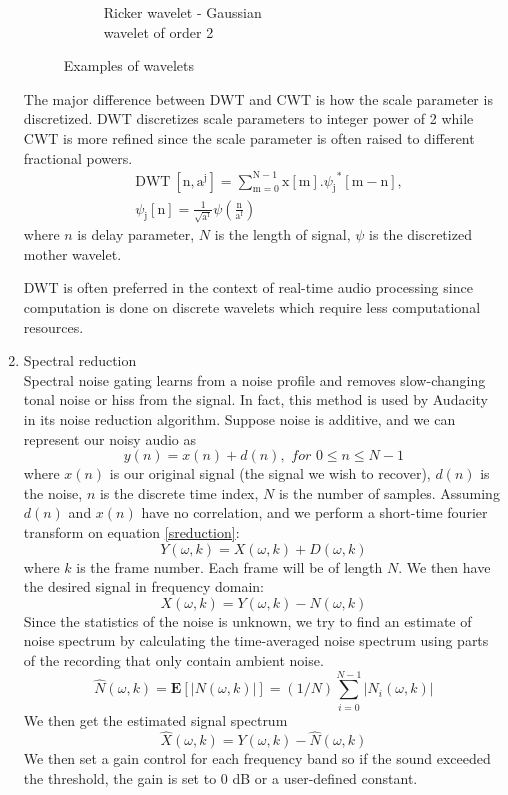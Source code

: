 \begin{enumerate}
\begin{figure}
\begin{subfigure}{.4\textwidth}
          \caption{Ricker wavelet - Gaussian \\wavelet of order 2}
          \label{Ricker}
        \end{subfigure}

        \caption{Examples of wavelets}
        \label{fig:test}
    \end{figure}
    
    The major difference between DWT and CWT is how the scale parameter is discretized. DWT discretizes scale parameters to integer power of 2 while CWT is more refined since 
    the scale parameter is often raised to different fractional powers.
    \begin{align*} &\text{DWT}\ [\mathrm{n},\mathrm{a}^{\mathrm{j}}]=\sum_{\mathrm{m}=0}^{\mathrm{N}-1}\mathrm{x}[\mathrm{m}].{\psi_{\mathrm{j}}}^{*}[\mathrm{m}-\mathrm{n}],\\ &\psi_{\mathrm{j}}[\mathrm{n}]=\frac{1}{\sqrt{\mathrm{a}^{\mathrm{f}}}}\psi\left(\frac{\mathrm{n}}{\mathrm{a}^{\mathrm{f}}}\right) \tag{2} \end{align*}
    where $n$ is delay parameter, $N$ is the length of signal, $\psi$ is the discretized mother wavelet. 

    DWT is often preferred in the context of real-time audio processing since computation is done on discrete wavelets which require less computational resources.
    
    \item Spectral reduction\\
    Spectral noise gating learns from a noise profile and removes slow-changing tonal noise or hiss from the signal. In 
    fact, this method is used by Audacity in its noise reduction algorithm. 
    Suppose noise is additive, and we can represent our noisy audio as
    \[y(n) = x(n) + d(n), \textit{ for } 0 \leq n \leq N-1 \label{sreduction} \]
    where $x(n)$ is our original signal (the signal we wish to recover), $d(n)$ is the noise, $n$ is the discrete time index,
    $N$ is the number of samples. 
    Assuming $d(n)$ and $x(n)$ have no correlation, and we perform a short-time fourier transform on equation \ref{sreduction}:
    \[Y(\omega,k)= X(\omega,k) + D(\omega,k)\]
    where $k$ is the frame number. Each frame will be of
    length $N$. We then have the desired signal in frequency domain:
    \[X(\omega,k) = Y(\omega,k) - N(\omega,k)\]
    Since the statistics of the noise is unknown, we try to find an estimate of noise spectrum by calculating the time-averaged
    noise spectrum using parts of the recording that only contain ambient noise. 
    \[\hat{N}(\omega,k) = \textbf{E}[|N(\omega,k)|] = (1/N)\sum_{i=0}^{N-1}|N_i(\omega,k)|\]
    We then get the estimated signal spectrum
    \[\hat{X}(\omega,k) = Y(\omega,k) - \hat{N}(\omega,k)\]
    We then set a gain control for each frequency band so if the sound exceeded the threshold, the gain is set to 0 dB or a user-defined
    constant.
\end{enumerate}
